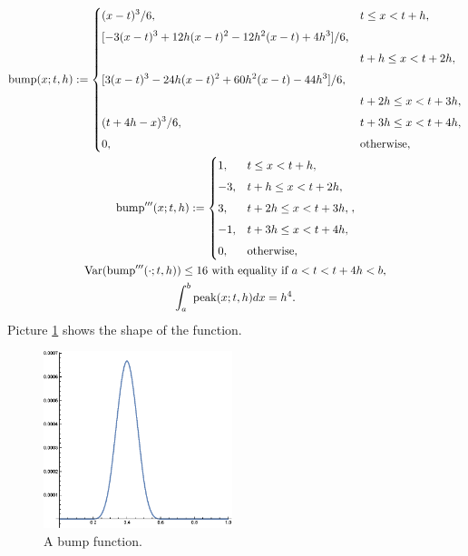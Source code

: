 \documentclass{iitthesis}
\DeclareMathOperator{\Var}{Var}
\theoremstyle{definition}
\theoremstyle{remark}
\begin{document}
\begin{subequations} \label{bumpfunction}
\begin{gather}
\text{bump}(x;t,h):= \begin{cases} \displaystyle (x-t)^3/6, & t \le x < t+h,\\[1ex]
\displaystyle [-3(x-t)^3+12h(x-t)^2-12h^2(x-t)+4h^3]/6,\\[1ex] \displaystyle & t+h \le x < t+2h,\\[1ex]
\displaystyle [3(x-t)^3-24h(x-t)^2+60h^2(x-t)-44h^3]/6,\\[1ex] \displaystyle & t+2h \le x < t+3h,\\[1ex]
\displaystyle (t+4h-x)^3/6, & t+3h \le x < t+4h,\\[1ex]
\displaystyle  0, & \text{otherwise},
\end{cases}
\\
\text{bump}'''(x;t,h):= \begin{cases} \displaystyle 1, & t \le x < t+h,\\[1ex]
\displaystyle -3, & t+h \le x < t+2h,\\[1ex]
\displaystyle 3, & t+2h \le x < t+3h,\\[1ex]
\displaystyle -1, & t+3h \le x < t+4h,\\[1ex]
\displaystyle  0, & \text{otherwise},
\end{cases}, \\
\Var(\text{bump}'''(\cdot;t,h))\le 16 \text{ with equality if } a<t<t+4h<b, \\
\int_{a}^{b}\text{peak}(x;t,h)dx=h^4.
\end{gather}
\end{subequations}
Picture \ref{fig:bumpfunction} shows the shape of the function.
\begin{figure}
\centering
\includegraphics[width=5.5cm]{bump.eps}
\caption{A bump function. \label{fig:bumpfunction}}
\end{figure}
\end{document}
